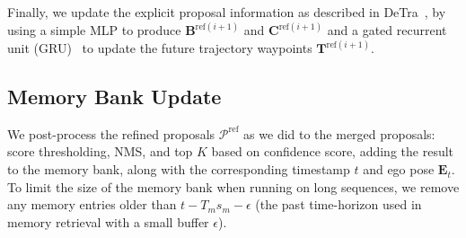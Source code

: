 Finally, we update the explicit proposal information as described in DeTra~\cite{casas2024detra}, by using a simple MLP to produce $\mathbf{B}^{\mathrm{ref}(i+1)}$ and $\mathbf{C}^{\mathrm{ref}(i+1)}$ and a gated recurrent unit (GRU)~\cite{cho2014learning} to update the future trajectory waypoints $\mathbf{T}^{\mathrm{ref}(i+1)}$.

\subsection{Memory Bank Update}
We post-process the refined proposals $\mathcal{P}^{\mathrm{ref}}$ as we did to the merged proposals: score thresholding,
NMS, and top $K$ based on confidence score,
adding the result to the memory bank, along with the corresponding timestamp $t$ and ego pose $\mathbf{E}_t$.
To limit the size of the memory bank when running on long sequences,
we remove any memory entries older than $t - T_m s_m - \epsilon$ (the past time-horizon used in memory retrieval with a small buffer $\epsilon$).